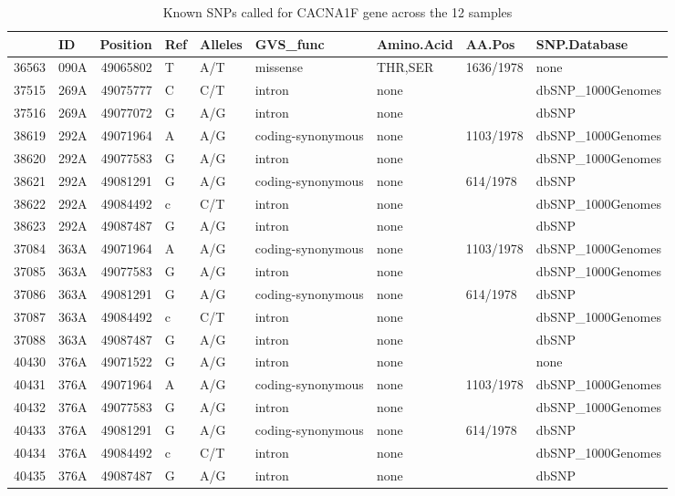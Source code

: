 \documentclass{article}
\begin{document}
\begin{table}[tbp]
\centering
\caption{Known SNPs called for CACNA1F gene across the 12 samples} 
\label{tab:SNPa1F}
{\tiny
\begin{tabular}{rlrllllll}
  \hline
 & ID & Position & Ref & Alleles & GVS\_func & Amino.Acid & AA.Pos & SNP.Database \\ 
  \hline
36563 & 090A & 49065802 & T & A/T & missense & THR,SER & 1636/1978 & none \\ 
  37515 & 269A & 49075777 & C & C/T & intron & none &  & dbSNP\_1000Genomes \\ 
  37516 & 269A & 49077072 & G & A/G & intron & none &  & dbSNP \\ 
  38619 & 292A & 49071964 & A & A/G & coding-synonymous & none & 1103/1978 & dbSNP\_1000Genomes \\ 
  38620 & 292A & 49077583 & G & A/G & intron & none &  & dbSNP\_1000Genomes \\ 
  38621 & 292A & 49081291 & G & A/G & coding-synonymous & none & 614/1978 & dbSNP \\ 
  38622 & 292A & 49084492 & c & C/T & intron & none &  & dbSNP\_1000Genomes \\ 
  38623 & 292A & 49087487 & G & A/G & intron & none &  & dbSNP \\ 
  37084 & 363A & 49071964 & A & A/G & coding-synonymous & none & 1103/1978 & dbSNP\_1000Genomes \\ 
  37085 & 363A & 49077583 & G & A/G & intron & none &  & dbSNP\_1000Genomes \\ 
  37086 & 363A & 49081291 & G & A/G & coding-synonymous & none & 614/1978 & dbSNP \\ 
  37087 & 363A & 49084492 & c & C/T & intron & none &  & dbSNP\_1000Genomes \\ 
  37088 & 363A & 49087487 & G & A/G & intron & none &  & dbSNP \\ 
  40430 & 376A & 49071522 & G & A/G & intron & none &  & none \\ 
  40431 & 376A & 49071964 & A & A/G & coding-synonymous & none & 1103/1978 & dbSNP\_1000Genomes \\ 
  40432 & 376A & 49077583 & G & A/G & intron & none &  & dbSNP\_1000Genomes \\ 
  40433 & 376A & 49081291 & G & A/G & coding-synonymous & none & 614/1978 & dbSNP \\ 
  40434 & 376A & 49084492 & c & C/T & intron & none &  & dbSNP\_1000Genomes \\ 
  40435 & 376A & 49087487 & G & A/G & intron & none &  & dbSNP \\ 

\end{tabular}}
\end{table}
\end{document}

